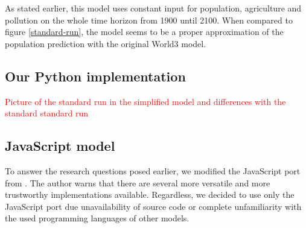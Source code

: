 \documentclass[10pt,a4paper]{scrartcl}
\begin{document}
As stated earlier, this model uses constant input for population, agriculture and pollution on the whole time horizon from 1900 until 2100. When compared to figure \ref{standard-run}, the model seems to be a proper approximation of the population prediction with the original World3 model.

\subsection*{Our Python implementation}

\textcolor{red}{Picture of the standard run in the simplified model and differences with the standard standard run}

\subsection*{JavaScript model}

To answer the research questions posed earlier, we modified the JavaScript port from \cite{blogpost}. The author warns that there are several more versatile and more trustworthy implementations available. Regardless, we decided to use only the JavaScript port due unavailability of source code or complete unfamiliarity with the used programming languages of other models.
\end{document}
